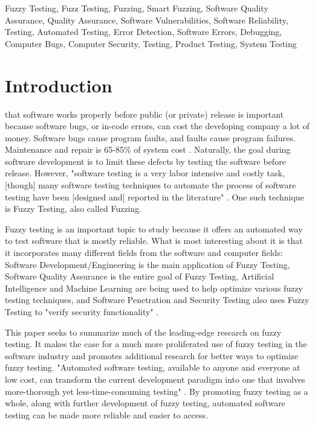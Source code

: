 \documentclass[10pt, final, journal, letterpaper, twoside, twocolumn]{IEEEtran}
\begin{document}
\begin{IEEEkeywords}
	Fuzzy Testing, Fuzz Testing, Fuzzing, Smart Fuzzing, Software Quality Assurance, Quality Assurance, Software Vulnerabilities, Software Reliability, Testing, Automated Testing, Error Detection, Software Errors, Debugging, Computer Bugs, Computer Security, Testing, Product Testing, System Testing
\end{IEEEkeywords}

\section{Introduction}
	 that software works properly before public (or private) release is important because software bugs, or in-code errors, can cost the developing company a lot of money. Software bugs cause program faults, and faults cause program failures. Maintenance and repair is 65-85\% of system cost \cite{slides}. Naturally, the goal during software development is to limit these defects by testing the software before release. However, "software testing is a very labor intensive and costly task, [though] many software testing techniques to automate the process of software testing have been [designed and] reported in the literature" \cite{fuzzy-logic}. One such technique is Fuzzy Testing, also called Fuzzing.
	
	Fuzzy testing is an important topic to study because it offers an automated way to test software that is mostly reliable. What is most interesting about it is that it incorporates many different fields from the software and computer fields: Software Development/Engineering is the main application of Fuzzy Testing, Software Quality Assurance is the entire goal of Fuzzy Testing, Artificial Intelligence and Machine Learning are being used to help optimize various fuzzy testing techniques, and Software Penetration and Security Testing also uses Fuzzy Testing to "verify security functionality" \cite{penetration}.
	
	This paper seeks to summarize much of the leading-edge research on fuzzy testing. It makes the case for a much more proliferated use of fuzzy testing in the software industry and promotes additional research for better ways to optimize fuzzy testing. "Automated software testing, available to anyone and everyone at low cost, can transform the current development paradigm into one that involves more-thorough yet less-time-consuming testing" \cite{automation}. By promoting fuzzy testing as a whole, along with further development of fuzzy testing, automated software testing can be made more reliable and easier to access.
\end{document}
